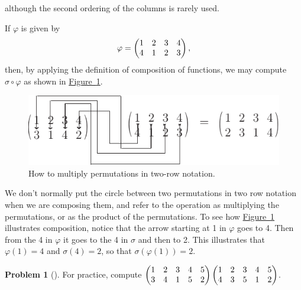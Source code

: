 \documentclass[10pt,]{book}
\theoremstyle{plain}
\theoremstyle{definition}
\newtheorem{activity}[project]{Problem}
\theoremstyle{definition}
\numberwithin{equation}{chapter}
\newcommand{\amp}{&}
\begin{document}
although the second ordering of the columns is rarely used.%
\par
If \(\varphi\) is given by%
\begin{equation*}
\varphi = \begin{pmatrix}1\amp 2\amp 3\amp 4\cr4\amp 1\amp 2\amp 3
\end{pmatrix} ,
\end{equation*}
then, by applying the definition of composition of functions, we may compute \(\sigma\circ
\varphi\) as shown in \hyperref[permutationproduct]{Figure~\ref{permutationproduct}}.%
\begin{figure}
\centering
\includegraphics[width=0.73\linewidth]{images/productofpermutations}
\caption{How to multiply permutations in two-row notation.\label{permutationproduct}}
\end{figure}
We don't normally put the circle between two permutations in two row notation when we are composing them, and refer to the operation as multiplying the permutations, or as the product of the permutations. To see how \hyperref[permutationproduct]{Figure~\ref{permutationproduct}} illustrates composition, notice that the arrow starting at 1 in \(\varphi\) goes to 4. Then from the 4 in \(\varphi\) it goes to the 4 in \(\sigma\) and then to 2. This illustrates that \(\varphi(1)=4\) and \(\sigma(4) =2\), so that \(\sigma(\varphi(1))=2\).%
\begin{activity}[]\marginsymbol[-1em]{} \label{activity-258}
For practice, compute \(\begin{pmatrix}1\amp 2\amp 3\amp 4\amp 5\cr3\amp 4\amp 1\amp 5\amp 2
\end{pmatrix}
\begin{pmatrix}1\amp 2\amp 3\amp 4\amp 5\cr 4\amp 3\amp 5\amp 1\amp 2
\end{pmatrix}\).%
\end{activity}
\typeout{************************************************}
\typeout{************************************************}
\end{document}
